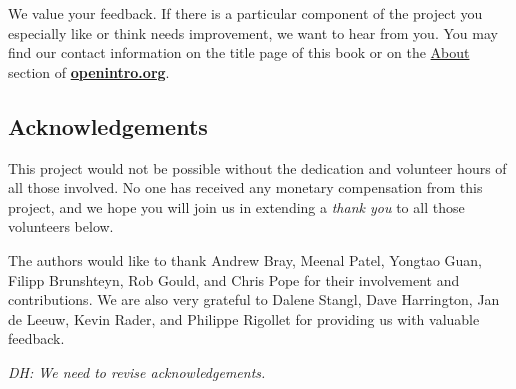 \begin{doublespace}

We value your feedback. If there is a particular component of the project you especially like or think needs improvement, we want to hear from you. You may find our contact information on the title page of this book or on the \href{http://www.openintro.org/about.php}{About} section of \href{http://www.openintro.org}{\color{black}\textbf{openintro.org}}.

\subsection*{Acknowledgements}

This project would not be possible without the dedication and volunteer hours of all those involved. No one has received any monetary compensation from this project, and we hope you will join us in extending a \emph{thank you} to all those volunteers below.

The authors would like to thank Andrew Bray, Meenal Patel, Yongtao Guan, Filipp Brunshteyn, Rob Gould, and Chris Pope for their involvement and contributions. %
We are also very grateful to Dalene Stangl, Dave Harrington, Jan de Leeuw, Kevin Rader, and Philippe Rigollet for providing us with valuable feedback.

\textit{DH: We need to revise acknowledgements.}



\begin{comment}

@article{smith1998fifty,
  title={Fifty years of randomised controlled trials},
  author={Smith, R},
  journal={British Medical Journal},
  volume={317},
  pages={1166},
  year={1998}
}

\end{comment}

\end{doublespace}